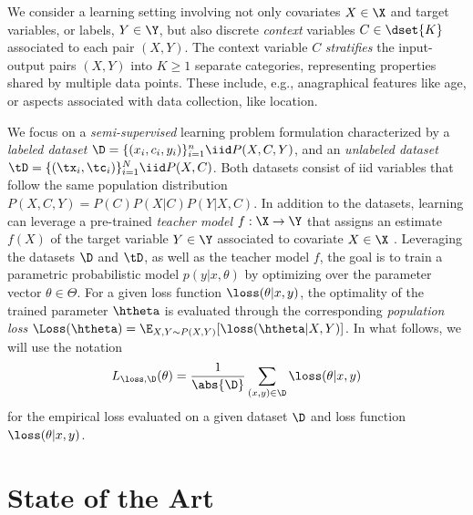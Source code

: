 \documentclass[journal]{IEEEtran}
\begin{document}
We consider a learning setting involving not only covariates $X \in \X$ and target variables, or labels, $Y \in \Y$, but also discrete \emph{context} variables $C \in \dset{K}$ associated to each pair $(X, Y)$.
The context variable $C$ \emph{stratifies} the input-output pairs $(X, Y)$ into $K \geq 1$ separate categories, representing properties shared by multiple data points.
These include, e.g., anagraphical features like age, or aspects associated with data collection, like location.

We focus on a \emph{semi-supervised} learning problem formulation characterized by a \emph{labeled dataset} $\D = \{(x_i, c_i, y_i)\}_{i=1}^{n} \iid P(X, C, Y)$, and an \emph{unlabeled dataset} $\tD = \{(\tx_i, \tc_i)\}_{i=1}^{N} \iid P(X, C)$.
Both datasets consist of \gls{iid} variables that follow the same population distribution $P(X, C, Y) = P(C) P(X|C) P(Y|X, C)$.
In addition to the datasets, learning can leverage a pre-trained \emph{teacher model} $f: \X \to \Y$ that assigns an estimate $f(X)$ of the target variable $Y \in \Y$ associated to covariate $X \in \X$ \cite{zhu2024doubly, amini2025self}.
Leveraging the datasets $\D$ and $\tD$, as well as the teacher model $f$, the goal is to train a parametric probabilistic model $p(y | x, \theta)$ by optimizing over the parameter vector $\theta \in \Theta$.
For a given loss function $\loss(\theta| x, y)$, the optimality of the trained parameter $\htheta$ is evaluated through the corresponding \emph{population loss} $\Loss(\htheta) = \E_{X, Y \sim P(X, Y)}[\loss(\htheta | X, Y)]$.
In what follows, we will use the notation
\begin{equation}
    L_{\loss, \D}(\theta) = \frac{1}{\abs{\D}} \sum_{(x, y) \in \D} \loss(\theta | x, y)
\end{equation}
for the empirical loss evaluated on a given dataset $\D$ and loss function $\loss(\theta| x, y)$.


\section{State of the Art} \label{sec:background}
\end{document}
